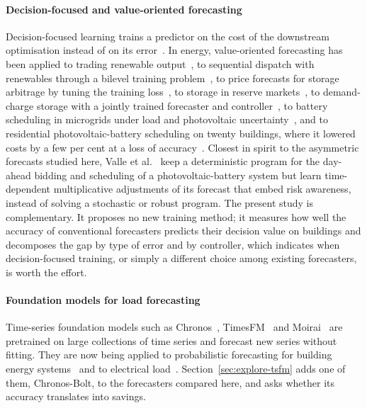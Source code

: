 \paragraph{Decision-focused and value-oriented forecasting} Decision-focused learning trains a predictor on the cost of the downstream optimisation instead of on its error~\cite{elmachtoub2022spo,mandi2024dfl,sadana2025survey}. In energy, value-oriented forecasting has been applied to trading renewable output~\cite{stratigakos2021value}, to sequential dispatch with renewables through a bilevel training problem~\cite{zhang2025valueoriented}, to price forecasts for storage arbitrage by tuning the training loss~\cite{smets2025valueprice}, to storage in reserve markets~\cite{paredes2025dflreserve}, to demand-charge storage with a jointly trained forecaster and controller~\cite{kim2025neural}, to battery scheduling in microgrids under load and photovoltaic uncertainty~\cite{saleptsis2026dfl}, and to residential photovoltaic-battery scheduling on twenty buildings, where it lowered costs by a few per cent at a loss of accuracy~\cite{depoortere2026dfl}. Closest in spirit to the asymmetric forecasts studied here, Valle et al.~\cite{valle2027riskaware} keep a deterministic program for the day-ahead bidding and scheduling of a photovoltaic-battery system but learn time-dependent multiplicative adjustments of its forecast that embed risk awareness, instead of solving a stochastic or robust program. The present study is complementary. It proposes no new training method; it measures how well the accuracy of conventional forecasters predicts their decision value on  buildings and decomposes the gap by type of error and by controller, which indicates when decision-focused training, or simply a different choice among existing forecasters, is worth the effort.

\paragraph{Foundation models for load forecasting} Time-series foundation models such as Chronos~\cite{ansari2024chronos,ansari2025chronos2}, TimesFM~\cite{das2024timesfm} and Moirai~\cite{woo2024moirai} are pretrained on large collections of time series and forecast new series without fitting. They are now being applied to probabilistic forecasting for building energy systems~\cite{park2025tsfmbuildings} and to electrical load~\cite{liao2025timegpt}. Section~\ref{sec:explore-tsfm} adds one of them, Chronos-Bolt, to the forecasters compared here, and asks whether its accuracy translates into savings.
